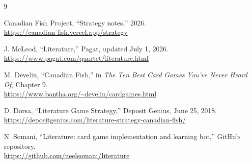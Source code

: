 \documentclass[11pt]{article}
\begin{document}
\begin{thebibliography}{9}

Canadian Fish Project, ``Strategy notes,'' 2026.\\
\url{https://canadian-fish.vercel.app/strategy}

J. McLeod, ``Literature,'' Pagat, updated July 1, 2026.\\
\url{https://www.pagat.com/quartet/literature.html}

M. Develin, ``Canadian Fish,'' in \emph{The Ten Best Card Games You've Never Heard Of}, Chapter 9.\\
\url{https://www.bantha.org/~develin/cardgames.html}

D. Dorsa, ``Literature Game Strategy,'' Deposit Genius, June 25, 2018.\\
\url{https://depositgenius.com/literature-strategy-canadian-fish/}

N. Somani, ``Literature: card game implementation and learning bot,'' GitHub repository.\\
\url{https://github.com/neelsomani/literature}

\end{thebibliography}
\end{document}
